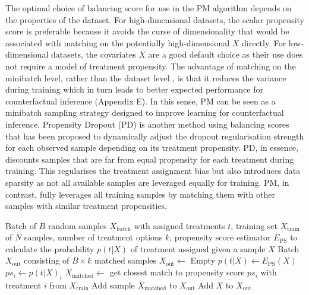\documentclass{article}
\begin{document}
The optimal choice of balancing score for use in the PM algorithm depends on the properties of the dataset. For high-dimensional datasets, the scalar propensity score is preferable because it avoids the curse of dimensionality that would be associated with matching on the potentially high-dimensional $X$ directly. For low-dimensional datasets, the covariates $X$ are a good default choice as their use does not require a model of treatment propensity. The advantage of matching on the minibatch level, rather than the dataset level \cite{ho2011matchit}, is that it reduces the variance during training which in turn leads to better expected performance for counterfactual inference (Appendix E). In this sense, PM can be seen as a minibatch sampling strategy \cite{csiba2018importance} designed to improve learning for counterfactual inference. Propensity Dropout (PD) \cite{alaa2017deep} is another method using balancing scores that has been proposed to dynamically adjust the dropout regularisation strength for each observed sample depending on its treatment propensity. PD, in essence, discounts samples that are far from equal propensity for each treatment during training. This regularises the treatment assignment bias but also introduces data sparsity as not all available samples are leveraged equally for training. PM, in contrast, fully leverages all training samples by matching them with other samples with similar treatment propensities.

\begin{algorithm}
\caption{Perfect Match (PM). After augmentation, each batch contains an equal number of samples from each treatment and the covariates $x_i$ across treatments are approximately balanced.}
\label{alg:pm}
\begin{algorithmic}[1]
\Require Batch of $B$ random samples $X_\text{batch}$ with assigned treatments $t$, training set $X_\text{train}$ of $N$ samples, number of treatment options $k$, propensity score estimator $E_\text{PS}$ to calculate the probability $p(t|X)$ of treatment assigned given a sample $X$
\Ensure Batch $X_\text{out}$ consisting of $B\times k$ matched samples
\State $X_\text{out} \gets$ Empty
\State $p(t|X) \gets E_\text{PS}(X)$
\State $ps_i \gets p(t|X)_i$
\State $X_\text{matched} \gets$ get closest match to propensity score $ps_i$ with treatment $i$ from $X_\text{train}$ 
\State Add sample $X_\text{matched}$ to $X_\text{out}$
\EndIf
\EndFor
\State Add $X$ to $X_\text{out}$
\EndFor
\EndProcedure
\end{algorithmic}
\end{algorithm}
\setlength{\textfloatsep}{10pt}
\end{document}
